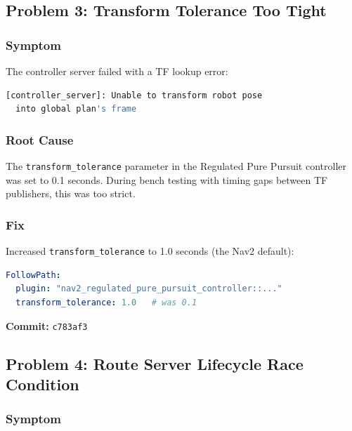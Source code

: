 \documentclass[11pt,a4paper]{article}
\begin{document}

\subsection{Problem 3: Transform Tolerance Too Tight}

\subsubsection*{Symptom}

The controller server failed with a TF lookup error:

\begin{lstlisting}[language=bash]
[controller_server]: Unable to transform robot pose
  into global plan's frame
\end{lstlisting}

\subsubsection*{Root Cause}

The \texttt{transform\_tolerance} parameter in the Regulated Pure Pursuit controller was set to 0.1 seconds. During bench testing with timing gaps between TF publishers, this was too strict.

\subsubsection*{Fix}

Increased \texttt{transform\_tolerance} to 1.0 seconds (the Nav2 default):

\begin{lstlisting}[language=yaml,caption={nav2\_params.yaml --- FollowPath controller}]
FollowPath:
  plugin: "nav2_regulated_pure_pursuit_controller::..."
  transform_tolerance: 1.0   # was 0.1
\end{lstlisting}

\textbf{Commit:} \texttt{c783af3}


\subsection{Problem 4: Route Server Lifecycle Race Condition}

\subsubsection*{Symptom}
\end{document}
